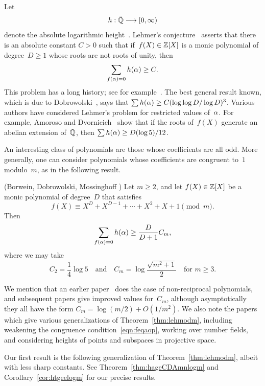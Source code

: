 \documentclass[12pt,reqno]{amsart}
\begin{document}
Let
\[
  h:{\bar{\mathbb{Q}}}\longrightarrow[0,\infty)
\]
denote the absolute logarithmic height~\cite{HiSi,LangDG}. Lehmer's
conjecture~\cite{Leh} asserts that there is an absolute constant $C>0$
such that if~$f(X)\in\mathbb{Z}[X]$ is a monic polynomial of degree~$D\ge1$
whose roots are not roots of unity, then
\begin{equation}
  \label{eqn:lehmerconj}
  \sum_{f(\alpha)=0} h(\alpha) \ge C.
\end{equation}
This problem has a long history; see for
example~\cite{BlMo,Leh,Smy2,Smy1,Stew}.  The best general result
known, which is due to Dobrowolski~\cite{Dob}, says that $\sum
h(\alpha)\ge C(\log\log D/\log D)^3$.  Various authors have considered
Lehmer's problem for restricted values of~$\alpha$. For example, Amoroso
and Dvornicich~\cite{AmDv} show that if the roots of~$f(X)$ generate
an abelian extension of~$\mathbb{Q}$, then $\sum h(\alpha)\ge D(\log5)/12$.  
\par
An interesting class of polynomials are those whose coefficients are
all odd. More generally, one can consider polynomials whose
coefficients are congruent to~$1$ modulo~$m$, as in the following
result.

\begin{theorem}
\label{thm:lehmodm}
\textup{(Borwein, Dobrowolski, Mossinghoff \cite{BoDoMo})} 
Let $m\ge2$, and let $f(X)\in\mathbb{Z}[X]$ be a monic polynomial of
degree~$D$ that satisfies
\begin{equation}
\label{eqn:feqaop}
   f(X) \equiv X^D+X^{D-1}+\cdots+X^2+X+1 \pmod{m}.
\end{equation}
Then
\[
  \sum_{f(\alpha)=0} h(\alpha) \ge \frac{D}{D+1}C_m,
\]
where we may take
\[
  C_2 = \frac{1}{4}\log5
  \quad\text{and}\quad
  C_m = \log\frac{\sqrt{m^2+1}}{2}\quad\text{for $m\ge3$.}
\]
\end{theorem}

We mention that an earlier paper~\cite{BoHaMo} does the case of
non-reciprocal polynomials, and subsequent papers
\cite{DuMo,GaIsMoPiWi} give improved values for~$C_m$, although
asymptotically they all have the form $C_m=\log(m/2) + O(1/m^2)$.
We also note the papers~\cite{MR2313990,MR2496463} which give various
generalizations of Theorem~\ref{thm:lehmodm}, including weakening the
congruence condition~\eqref{eqn:feqaop}, working over number fields,
and considering heights of points and subspaces in projective space.

Our first result is the following generalization of
Theorem~\ref{thm:lehmodm}, albeit with less sharp constants.  See
Theorem~\ref{thm:hageCDAmnlogm} and Corollary~\ref{cor:htgeelogm} for
our precise results.
\end{document}
